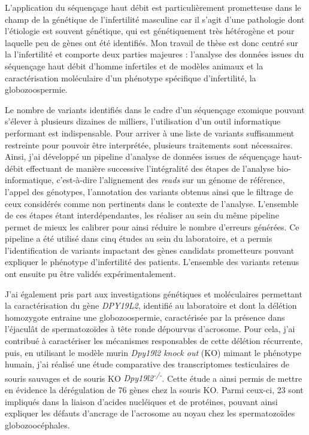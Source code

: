 \documentclass[12pt,a4paper,twoside]{ugathesis}
\theoremstyle{definition}
\theoremstyle{definition}
\theoremstyle{definition}
\theoremstyle{remark}
\begin{document}
L'application du séquençage haut débit est particulièrement prometteuse
dans le champ de la génétique de l'infertilité masculine car il s'agit
d'une pathologie dont l'étiologie est souvent génétique, qui est
génétiquement très hétérogène et pour laquelle peu de gènes ont été
identifiés. Mon travail de thèse est donc centré sur la l'infertilité et
comporte deux parties majeures : l'analyse des données issues du
séquençage haut débit d'homme infertiles et de modèles animaux et la
caractérisation moléculaire d'un phénotype spécifique d'infertilité, la
globozoospermie.

Le nombre de variants identifiés dans le cadre d'un séquençage exomique
pouvant s'élever à plusieurs dizaines de milliers, l'utilisation d'un
outil informatique performant est indispensable. Pour arriver à une
liste de variants suffisamment restreinte pour pouvoir être interprétée,
plusieurs traitements sont nécessaires. Ainsi, j'ai développé un
pipeline d'analyse de données issues de séquençage haut-débit effectuant
de manière successive l'intégralité des étapes de l'analyse
bio-informatique, c'est-à-dire l'alignement des \emph{reads} sur un
génome de référence, l'appel des génotypes, l'annotation des variants
obtenus ainsi que le filtrage de ceux considérés comme non pertinents
dans le contexte de l'analyse. L'ensemble de ces étapes étant
interdépendantes, les réaliser au sein du même pipeline permet de mieux
les calibrer pour ainsi réduire le nombre d'erreurs générées. Ce
pipeline a été utilisé dans cinq études au sein du laboratoire, et a
permis l'identification de variants impactant des gènes candidats
prometteurs pouvant expliquer le phénotype d'infertilité des patients.
L'ensemble des variants retenus ont ensuite pu être validés
expérimentalement.

J'ai également pris part aux investigations génétiques et moléculaires
permettant la caractérisation du gène \emph{DPY19L2}, identifié au
laboratoire et dont la délétion homozygote entraine une globozoospermie,
caractérisée par la présence dans l'éjaculât de spermatozoïdes à tête
ronde dépourvus d'acrosome. Pour cela, j'ai contribué à caractériser les
mécanismes responsables de cette délétion récurrente, puis, en utilisant
le modèle murin \emph{Dpy19l2 knock out} (KO) mimant le phénotype
humain, j'ai réalisé une étude comparative des transcriptomes
testiculaires de souris sauvages et de souris KO
\emph{Dpy19l2\textsuperscript{-/-}}. Cette étude a ainsi permis de
mettre en évidence la dérégulation de 76 gènes chez la souris KO. Parmi
ceux-ci, 23 sont impliqués dans la liaison d'acides nucléiques et de
protéines, pouvant ainsi expliquer les défauts d'ancrage de l'acrosome
au noyau chez les spermatozoïdes globozoocéphales.
\end{document}
